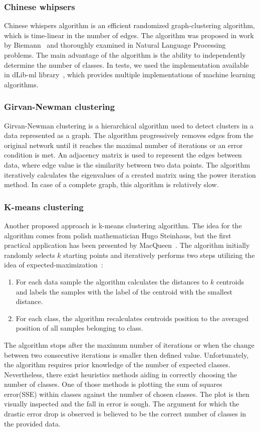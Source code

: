 \subsubsection{Chinese whipsers}
Chinese whispers algorithm is an efficient randomized graph-clustering algorithm, which is time-linear in the number of edges.
The algorithm was proposed in work by Biemann~\cite{CW1} and thoroughly examined in Natural Language Processing problems. 
The main advantage of the algorithm is the ability to independently determine the number of classes. 
In tests, we used the implementation available in dLib-ml library~\cite{dlib}, which provides multiple implementations of machine learning algorithms.

\subsubsection{Girvan-Newman clustering}
Girvan-Newman clustering is a hierarchical algorithm used to detect clusters in a data represented as a graph.
The algorithm progressively removes edges from the original network until it reaches the maximal number of iterations or an error condition is met.
An adjacency matrix is used to represent the edges between data, where edge value is the similarity between two data points.
The algorithm iteratively calculates the eigenvalues of a created matrix using the power iteration method. 
In case of a complete graph, this algorithm is relatively slow.

\subsubsection{K-means clustering}
Another proposed approach is k-means clustering algorithm.
The idea for the algorithm comes from polish mathematician Hugo Steinhaus, but the first practical application has been presented by MacQueen~\cite{kmeans2}.
The algorithm initially randomly selects $k$ starting points and iteratively performs two steps utilizing the idea of expected-maximization~\cite{expectedmaximization}:
\begin{enumerate}
\item For each data sample the algorithm calculates the distances to $k$ centroids and labels the samples with the label of the centroid with the smallest distance.
\item For each class, the algorithm recalculates centroids position to the averaged position of all samples belonging to class.
\end{enumerate} 
The algorithm stops after the maximum number of iterations or when the change between two consecutive iterations is smaller then defined value.
Unfortunately, the algorithm requires prior knowledge of the number of expected classes.
Nevertheless, there exist heuristics methods aiding in correctly choosing the number of classes. 
One of those methods is plotting the sum of squares error(SSE) within classes against the number of chosen classes. 
The plot is then visually inspected and the fall in error is sough.
The argument for which the drastic error drop is observed is believed to be the correct number of classes in the provided data.

